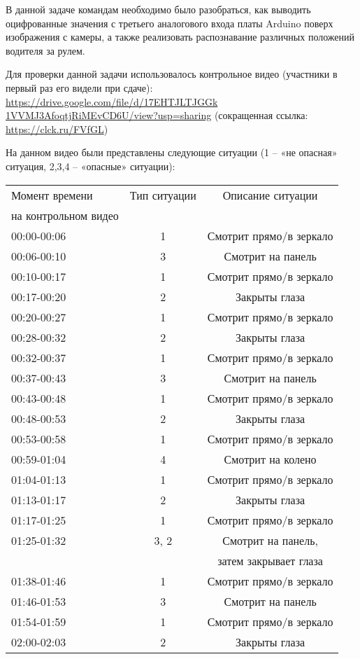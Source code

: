\solutionSection

В данной задаче командам необходимо было разобраться, как выводить оцифрованные значения с третьего аналогового входа платы Arduino поверх изображения с камеры, а также реализовать распознавание различных положений водителя за рулем. 

Для проверки данной задачи использовалось контрольное видео (участники в первый раз его видели при сдаче): \url{https://drive.google.com/file/d/17EHTJLTJGGk} \linebreak \url{1VVMJ3AfoqtjRiMEvCD6U/view?usp=sharing} (сокращенная ссылка: \url{https://clck.ru/FVfGL})

На данном видео были представлены следующие ситуации (1 – «не опасная» ситуация, 2,3,4 – «опасные» ситуации):

\begin{table}[H]
    \begin{tabular}{|l|c|c|}
        \hline
        Момент времени & Тип ситуации & Описание ситуации \\
        на контрольном видео & & \\
        \hline
        00:00-00:06 & 1 & Смотрит прямо/в зеркало \\
        00:06-00:10 & 3 & Смотрит на панель \\
        00:10-00:17 & 1 & Смотрит прямо/в зеркало \\
        00:17-00:20 & 2 & Закрыты глаза \\
        00:20-00:27 & 1 & Смотрит прямо/в зеркало \\
        00:28-00:32 & 2 & Закрыты глаза \\
        00:32-00:37 & 1 & Смотрит прямо/в зеркало \\
        00:37-00:43 & 3 & Смотрит на панель \\
        00:43-00:48 & 1 & Смотрит прямо/в зеркало \\
        00:48-00:53 & 2 & Закрыты глаза \\
        00:53-00:58 & 1 & Смотрит прямо/в зеркало \\
        00:59-01:04 & 4 & Смотрит на колено \\
        01:04-01:13 & 1 & Смотрит прямо/в зеркало \\
        01:13-01:17 & 2 & Закрыты глаза \\
        01:17-01:25 & 1 & Смотрит прямо/в зеркало \\
        01:25-01:32 & 3, 2 & Смотрит на панель, \\
        & & затем закрывает глаза \\
        01:38-01:46 & 1 & Смотрит прямо/в зеркало \\
        01:46-01:53 & 3 & Смотрит на панель \\
        01:54-01:59 & 1 & Смотрит прямо/в зеркало \\
        02:00-02:03 & 2 & Закрыты глаза \\
        \hline
    \end{tabular}
\end{table}


